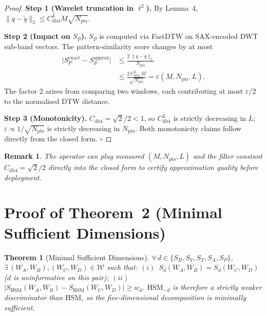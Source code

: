 \documentclass[10pt,twocolumn,a4paper]{article}
\newtheorem{theorem}{Theorem}
\newtheorem{remark}{Remark}
\newcommand{\SHSM}{S_{\mathrm{HSM}}}
\newcommand{\SR}{S_{R}}
\newcommand{\SV}{S_{V}}
\newcommand{\ST}{S_{T}}
\newcommand{\SA}{S_{A}}
\newcommand{\SPER}{S_{P}}
\newcommand{\Npts}{N_{\mathrm{pts}}}
\newcommand{\Cdb}{C_{\mathrm{db4}}}
\begin{document}
\begin{proof}
\textbf{Step 1 (Wavelet truncation in $\ell^{2}$).}
By Lemma~4, $\|q-\tilde{q}\|_{2}\leq\Cdb^{L}M\sqrt{\Npts}$.

\textbf{Step 2 (Impact on $\SPER$).}
$\SPER$ is computed via FastDTW on SAX-encoded DWT sub-band vectors.
The pattern-similarity score changes by at most
\begin{align*}
  \bigl|S_{P}^{\mathrm{exact}}-S_{P}^{\mathrm{approx}}\bigr|
  &\leq\frac{2\,\|q-\tilde{q}\|_{2}}{\Npts}\\
  &\leq\frac{2\,\Cdb^{L}\,M}{\sqrt{\Npts}}
  =\varepsilon(M,\Npts,L).
\end{align*}
The factor 2 arises from comparing two windows, each contributing at
most $\varepsilon/2$ to the normalised DTW distance.

\textbf{Step 3 (Monotonicity).}
$\Cdb=\sqrt{2}/2<1$, so $\Cdb^{L}$ is strictly decreasing in $L$;
$\varepsilon\propto 1/\sqrt{\Npts}$ is strictly decreasing in $\Npts$.
Both monotonicity claims follow directly from the closed form.
\hfill$\square$
\end{proof}

\begin{remark}
The operator can plug measured $(M,\Npts,L)$ and the filter constant
$\Cdb=\sqrt{2}/2$ directly into the closed form to certify
approximation quality before deployment.
\end{remark}

\section{Proof of Theorem~2 (Minimal Sufficient Dimensions)}

\begin{theorem}[Minimal Sufficient Dimensions]
$\forall\,d\in\{\SR,\SV,\ST,\SA,\SPER\}$,
$\exists\,(W_A,W_B),(W_C,W_D)\in\mathcal{W}$ such that:
$(i)$~$S_d(W_A,W_B)=S_d(W_C,W_D)$ ($d$ is uninformative on this pair);
$(ii)$~$|\SHSM(W_A,W_B)-\SHSM(W_C,W_D)|\geq w_d$.
$\mathrm{HSM}_{-d}$ is therefore a strictly weaker discriminator than
$\mathrm{HSM}$, so the five-dimensional decomposition is minimally
sufficient.
\end{theorem}
\end{document}
